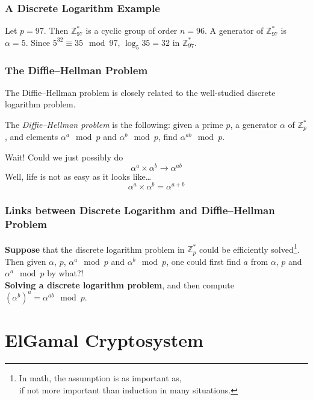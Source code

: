 \documentclass[hyperref=true]{beamer}
\begin{document}
\begin{frame}
  \frametitle{A Discrete Logarithm Example}
  \begin{example}
    Let $p=97$. Then $\mathbb{Z}_{97}^{*}$ is a cyclic group of order
    $n=96$. A generator of $\mathbb{Z}_{97}^{*}$ is $\alpha=5$. Since
    $5^{32}\equiv 35\mod 97$, $\log_{5}35 =32$ in $\mathbb{Z}_{97}^{*}$.
  \end{example}
\end{frame}

\begin{frame}
  \frametitle{The Diffie–Hellman Problem}
The Diffie–Hellman problem is closely related to the well-studied
discrete logarithm problem.
\begin{definition}
  The \emph{Diffie–Hellman problem} is the following: given a prime
  $p$, a generator $\alpha$ of $\mathbb{Z}_{p}^{*}$, and elements
  $\alpha^{a}\mod p$ and $\alpha^{b}\mod p$, find $\alpha^{ab}\mod p$.
\end{definition}
Wait! Could we just possibly do
\begin{equation}
  \label{eq:diffie–hellman-1}
  \alpha^{a}\times\alpha^{b}\rightarrow\alpha^{ab}
\end{equation}
Well, life is not as easy as it looks like\ldots
\begin{equation}
  \label{eq:diffie–hellman-2}
  \alpha^{a}\times\alpha^{b}=\alpha^{a+b}
\end{equation}

\end{frame}

\begin{frame}
  \frametitle{Links between Discrete Logarithm and Diffie–Hellman
    Problem}
\textbf{Suppose} that the discrete logarithm problem in
$\mathbb{Z}_{p}^{*}$ could be efficiently solved\footnote{In math,
  the assumption is as important as,\\ if not more important than
  induction in many situations.}. Then given $\alpha$, $p$,
$\alpha^{a}\mod p$ and $\alpha^{b}\mod p$, one could first find $a$
from $\alpha$, $p$ and $\alpha^{a}\mod p$ by
what?!\\[8pt]\textbf{Solving a discrete logarithm problem}, and  then
compute ${(\alpha^{b})}^{a}=\alpha^{ab}\mod p$.

\end{frame}

\section{ElGamal Cryptosystem}
\label{sec:elgamal-cryptosystem}
\end{document}
